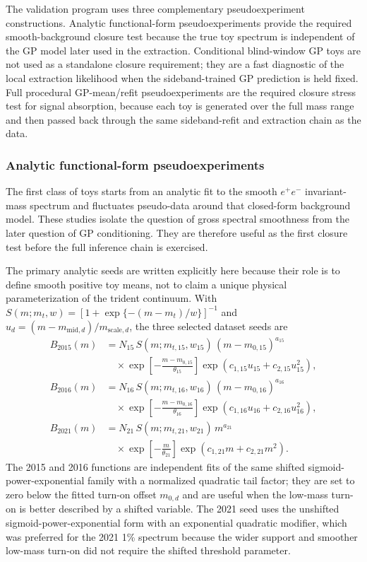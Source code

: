 The validation program uses three complementary pseudoexperiment constructions.
Analytic functional-form pseudoexperiments provide the required smooth-background closure test because the true toy spectrum is independent of the GP model later used in the extraction.
Conditional blind-window GP toys are not used as a standalone closure requirement; they are a fast diagnostic of the local extraction likelihood when the sideband-trained GP prediction is held fixed.
Full procedural GP-mean/refit pseudoexperiments are the required closure stress test for signal absorption, because each toy is generated over the full mass range and then passed back through the same sideband-refit and extraction chain as the data.

\subsubsection{Analytic functional-form pseudoexperiments}

The first class of toys starts from an analytic fit to the smooth $e^+e^-$
invariant-mass spectrum and fluctuates pseudo-data around that closed-form background model. These studies isolate the question of gross spectral smoothness from the later question of GP conditioning. They are therefore useful as the first closure test before the full inference chain is exercised.

The primary analytic seeds are written explicitly here because their role is to define smooth positive toy means, not to claim a unique physical parameterization of the trident continuum. With $S(m;m_t,w)=[1+\exp\{-(m-m_t)/w\}]^{-1}$ and $u_d=(m-m_{\mathrm{mid},d})/m_{\mathrm{scale},d}$, the three selected dataset seeds are
\begin{align}
B_{2015}(m) &=
N_{15}\,S(m;m_{t,15},w_{15})\,(m-m_{0,15})^{a_{15}}
\nonumber\\[-0.3ex]
&\quad{}\times
\exp\!\left[-\frac{m-m_{0,15}}{\theta_{15}}\right]
\exp\!\left(c_{1,15}u_{15}+c_{2,15}u_{15}^2\right),
\label{eq:funcform-seed-2015}\\
B_{2016}(m) &=
N_{16}\,S(m;m_{t,16},w_{16})\,(m-m_{0,16})^{a_{16}}
\nonumber\\[-0.3ex]
&\quad{}\times
\exp\!\left[-\frac{m-m_{0,16}}{\theta_{16}}\right]
\exp\!\left(c_{1,16}u_{16}+c_{2,16}u_{16}^2\right),
\label{eq:funcform-seed-2016}\\
B_{2021}(m) &=
N_{21}\,S(m;m_{t,21},w_{21})\,m^{a_{21}}
\nonumber\\[-0.3ex]
&\quad{}\times
\exp\!\left[-\frac{m}{\theta_{21}}\right]
\exp\!\left(c_{1,21}m+c_{2,21}m^2\right).
\label{eq:funcform-seed-2021}
\end{align}
The 2015 and 2016 functions are independent fits of the same shifted sigmoid-power-exponential family with a normalized quadratic tail factor; they are set to zero below the fitted turn-on offset $m_{0,d}$ and are useful when the low-mass turn-on is better described by a shifted variable. The 2021 seed uses the unshifted sigmoid-power-exponential form with an exponential quadratic modifier, which was preferred for the 2021 1\% spectrum because the wider support and smoother low-mass turn-on did not require the shifted threshold parameter.

